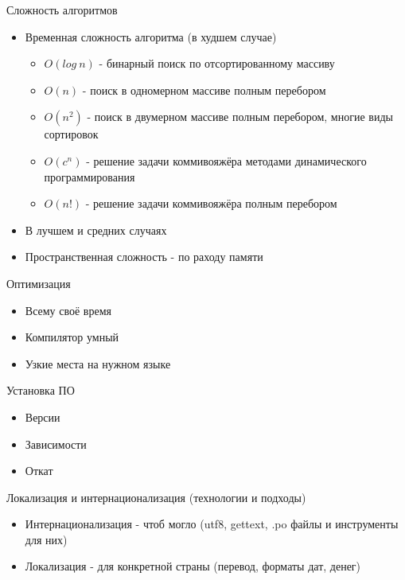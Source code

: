 \documentclass[aspectratio=169]{beamer}
\begin{document}
\begin{frame}{Сложность алгоритмов}
\begin{itemize}
\item Временная сложность алгоритма (в худшем случае)
\begin{itemize}
\item $O(log \: n)$ - бинарный поиск по отсортированному массиву
\item $O(n)$ - поиск в одномерном массиве полным перебором
\item $O(n^2)$ - поиск в двумерном массиве полным перебором, многие виды сортировок
\item $O(c^n)$ - решение задачи коммивояжёра методами динамического программирования
\item $O(n!)$ - решение задачи коммивояжёра полным перебором
\end{itemize}
\pause
\item В лучшем и средних случаях
\pause
\item Пространственная сложность - по раходу памяти
\end{itemize}
\end{frame}

\begin{frame}{Оптимизация}
\begin{itemize}
\item Всему своё время
\pause
\item Компилятор умный
\pause
\item Узкие места на нужном языке
\end{itemize}
\end{frame}

\begin{frame}{Установка ПО}
\begin{itemize}
\item Версии
\pause
\item Зависимости
\pause
\item Откат
\end{itemize}
\end{frame}

\begin{frame}{Локализация и интернационализация (технологии и подходы)}
\begin{itemize}
\item Интернационализация - чтоб могло (utf8, gettext, .po файлы и инструменты для них)
\pause
\item Локализация - для конкретной страны (перевод, форматы дат, денег)
\end{itemize}
\end{frame}
\end{document}
